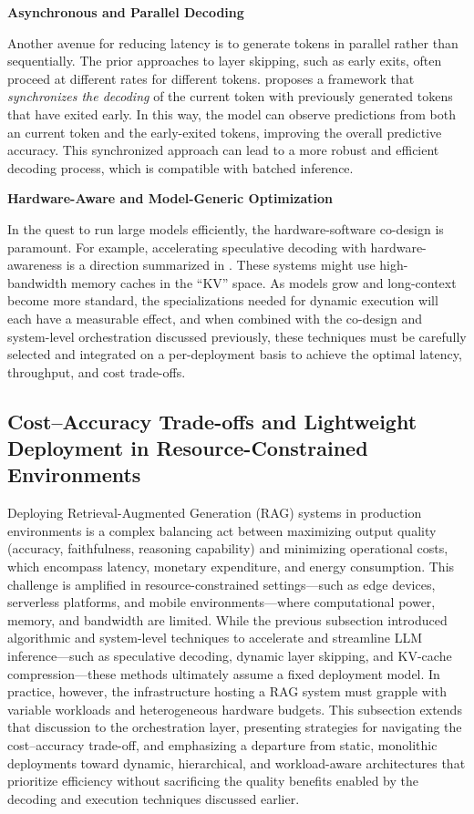 \documentclass[11pt]{article}
\begin{document}
\textbf{Asynchronous and Parallel Decoding}

Another avenue for reducing latency is to generate tokens in parallel rather than sequentially. The prior approaches to layer skipping, such as early exits, often proceed at different rates for different tokens. \cite{ref336} proposes a framework that \emph{synchronizes the decoding} of the current token with previously generated tokens that have exited early. In this way, the model can observe predictions from both an current token and the early-exited tokens, improving the overall predictive accuracy. This synchronized approach can lead to a more robust and efficient decoding process, which is compatible with batched inference.

\textbf{Hardware-Aware and Model-Generic Optimization}

In the quest to run large models efficiently, the hardware-software co-design is paramount. For example, accelerating speculative decoding with hardware-awareness is a direction summarized in \cite{ref337}. These systems might use high-bandwidth memory caches in the ``KV'' space. As models grow and long-context become more standard, the specializations needed for dynamic execution will each have a measurable effect, and when combined with the co-design and system-level orchestration discussed previously, these techniques must be carefully selected and integrated on a per-deployment basis to achieve the optimal latency, throughput, and cost trade-offs.

\subsection{Cost--Accuracy Trade-offs and Lightweight Deployment in Resource-Constrained Environments}

Deploying Retrieval-Augmented Generation (RAG) systems in production environments is a complex balancing act between maximizing output quality (accuracy, faithfulness, reasoning capability) and minimizing operational costs, which encompass latency, monetary expenditure, and energy consumption. This challenge is amplified in resource-constrained settings---such as edge devices, serverless platforms, and mobile environments---where computational power, memory, and bandwidth are limited. While the previous subsection introduced algorithmic and system-level techniques to accelerate and streamline LLM inference---such as speculative decoding, dynamic layer skipping, and KV-cache compression---these methods ultimately assume a fixed deployment model. In practice, however, the infrastructure hosting a RAG system must grapple with variable workloads and heterogeneous hardware budgets. This subsection extends that discussion to the orchestration layer, presenting strategies for navigating the cost--accuracy trade-off, and emphasizing a departure from static, monolithic deployments toward dynamic, hierarchical, and workload-aware architectures that prioritize efficiency without sacrificing the quality benefits enabled by the decoding and execution techniques discussed earlier.
\end{document}
